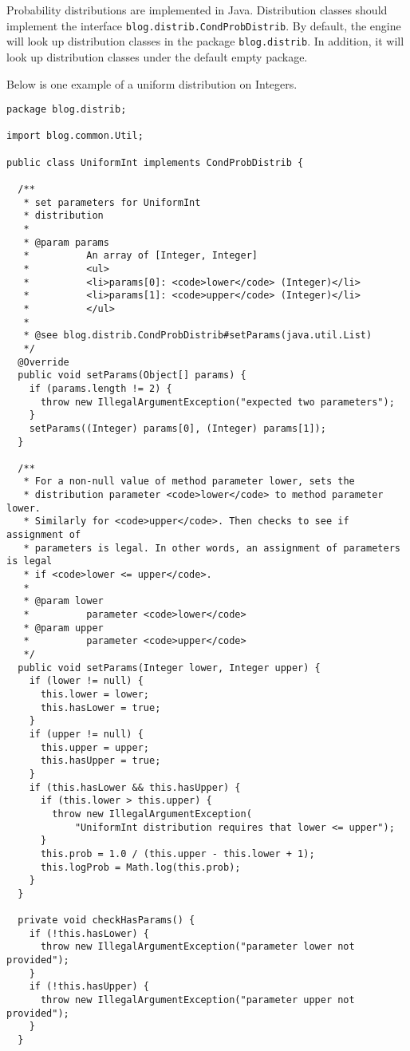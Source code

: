 Probability distributions are implemented in Java.  Distribution classes should implement the interface \verb|blog.distrib.CondProbDistrib|. 
By default, the \bl engine will look up distribution classes in the package \verb|blog.distrib|. In addition, it will look up distribution classes under the default empty package. 

Below is one example of a uniform distribution on Integers.
\begin{verbatim}
package blog.distrib;

import blog.common.Util;

public class UniformInt implements CondProbDistrib {

  /**
   * set parameters for UniformInt
   * distribution
   * 
   * @param params
   *          An array of [Integer, Integer]
   *          <ul>
   *          <li>params[0]: <code>lower</code> (Integer)</li>
   *          <li>params[1]: <code>upper</code> (Integer)</li>
   *          </ul>
   * 
   * @see blog.distrib.CondProbDistrib#setParams(java.util.List)
   */
  @Override
  public void setParams(Object[] params) {
    if (params.length != 2) {
      throw new IllegalArgumentException("expected two parameters");
    }
    setParams((Integer) params[0], (Integer) params[1]);
  }

  /**
   * For a non-null value of method parameter lower, sets the
   * distribution parameter <code>lower</code> to method parameter lower.
   * Similarly for <code>upper</code>. Then checks to see if assignment of
   * parameters is legal. In other words, an assignment of parameters is legal
   * if <code>lower <= upper</code>.
   * 
   * @param lower
   *          parameter <code>lower</code>
   * @param upper
   *          parameter <code>upper</code>
   */
  public void setParams(Integer lower, Integer upper) {
    if (lower != null) {
      this.lower = lower;
      this.hasLower = true;
    }
    if (upper != null) {
      this.upper = upper;
      this.hasUpper = true;
    }
    if (this.hasLower && this.hasUpper) {
      if (this.lower > this.upper) {
        throw new IllegalArgumentException(
            "UniformInt distribution requires that lower <= upper");
      }
      this.prob = 1.0 / (this.upper - this.lower + 1);
      this.logProb = Math.log(this.prob);
    }
  }

  private void checkHasParams() {
    if (!this.hasLower) {
      throw new IllegalArgumentException("parameter lower not provided");
    }
    if (!this.hasUpper) {
      throw new IllegalArgumentException("parameter upper not provided");
    }
  }


\end{verbatim}
